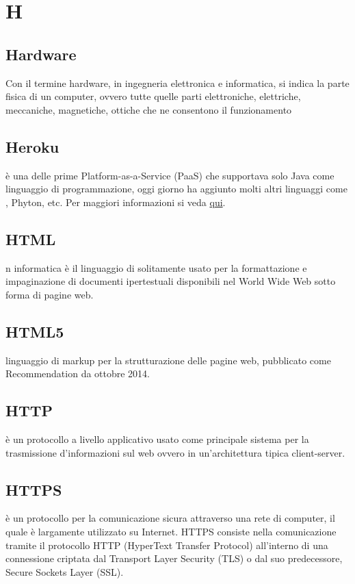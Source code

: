 \documentclass[12pt,a4paper]{article}
\begin{document}
\newpage

\section{H}


\subsection{Hardware} 
\hfill Con il termine hardware, in ingegneria elettronica e informatica, si indica la parte fisica di un computer, ovvero tutte quelle parti elettroniche, elettriche, meccaniche, magnetiche, ottiche che ne consentono il funzionamento\\	

\subsection{Heroku} 
 è una  delle prime  Platform-as-a-Service (PaaS) che supportava solo Java come linguaggio di programmazione, oggi giorno ha aggiunto molti altri linguaggi come , Phyton, etc. Per maggiori informazioni si veda \href{https://www.heroku.com}{qui}.

\subsection{HTML} 
 n informatica è il linguaggio di  solitamente usato per la formattazione e impaginazione di documenti ipertestuali disponibili nel World Wide Web sotto forma di pagine web.

\subsection{HTML5} 
 linguaggio di markup per la strutturazione delle pagine web, pubblicato come  Recommendation da ottobre 2014.

\subsection{HTTP} 
 è un protocollo a livello applicativo usato come principale sistema per la trasmissione d'informazioni sul web ovvero in un'architettura tipica client-server.

\subsection{HTTPS} 
 è un protocollo per la comunicazione sicura attraverso una rete di computer, il quale è largamente utilizzato su Internet. HTTPS consiste nella comunicazione tramite il protocollo HTTP (HyperText Transfer Protocol) all'interno di una connessione criptata dal Transport Layer Security (TLS) o dal suo predecessore, Secure Sockets Layer (SSL).
\end{document}
